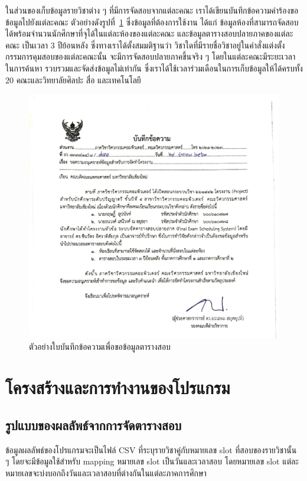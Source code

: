 ในส่วนของเก็บข้อมูลรายวิชาต่าง ๆ ที่มีการจัดสอบจากแต่ละคณะ เราได้เขียนบันทึกข้อความคำร้องขอข้อมูลไปยังแต่ละคณะ ตัวอย่างดังรูปที่~\ref{fig:request-memo-scan} 
ซึ่งข้อมูลที่ต้องการใช้งาน ได้แก่ ข้อมูลห้องที่สามารถจัดสอบได้พร้อมจำนวนนักศึกษาที่จุได้ในแต่ละห้องของแต่ละคณะ และข้อมูลตารางสอบปลายภาคของแต่ละคณะ เป็นเวลา 3 ปีย้อนหลัง
ซึ่งทางเราได้ตั้งสมมติฐานว่า วิชาใดที่มีรายชื่อวิชาอยู่ในคำสั่งแต่งตั้งกรรมการคุมสอบของแต่ละคณะนั้น จะมีการจัดสอบปลายภาคขึ้นจริง ๆ โดยในแต่ละคณะมีระยะเวลาในการค้นหา รวบรวมและจัดส่งข้อมูลไม่เท่ากัน
ซึ่งเราได้ใช้เวลาร่วมเดือนในการเก็บข้อมูลให้ได้ครบทั้ง 20 คณะและวิทยาลัยศิลปะ สื่อ และเทคโนโลยี
\begin{figure}
  \begin{center}
    \includegraphics[width=\linewidth]{images/request_memo_scan_crop.png}
  \end{center}
  \caption[ตัวอย่างใบบันทึกข้อความเพื่อขอข้อมูลตารางสอบ]{ตัวอย่างใบบันทึกข้อความเพื่อขอข้อมูลตารางสอบ}
  \label{fig:request-memo-scan}     
\end{figure}

\section{โครงสร้างและการทำงานของโปรแกรม}

\subsection{รูปแบบของผลลัพธ์จากการจัดตารางสอบ}
ข้อมูลผลลัพธ์ของโปรแกรมจะเป็นไฟล์ CSV ที่ระบุรายวิชาคู่กับหมายเลข slot ที่สอบของรายวิชานั้น ๆ โดยจะมีข้อมูลใช้สำหรับ mapping หมายเลข slot เป็นวันและเวลาสอบ
โดยหมายเลข slot แต่ละหมายเลขจะบ่งบอกถึงวันและเวลาสอบที่ต่างกันในแต่ละภาคการศึกษา

